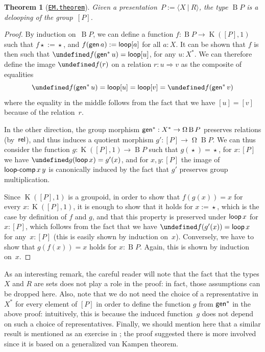 \documentclass[10pt,a4paper]{amsart}
\newtheorem{theorem}{Theorem}
\theoremstyle{definition}
\newcommand{\freegroup}[1]{#1^*} %
\newcommand{\pres}[2]{\langle #1\ |\ #2\rangle} %
\newcommand{\pgroup}[1]{[#1]} %
\newcommand{\B}{\operatorname{B}} %
\newcommand{\pt}[1]{\star_{#1}} %
\newcommand{\trunq}[2]{|#2|_{#1}} %
\newcommand{\strunq}[1]{\trunq0{#1}} %
\newcommand{\defd}{:=} %
\newcommand{\K}{\operatorname{K}} %
\newcommand{\Loop}{\operatorname{\Omega}} %
\let\cong\undefined
\newcommand{\cong}[1]{#1^=} %
\newcommand{\ap}{\cong}
\newcommand{\constructor}[1]{\operatorname{\textsf{\textup{#1}}}}
\newcommand{\cloop}{\constructor{loop}}
\newcommand{\cloopcomp}{\constructor{loop-comp}}
\newcommand{\cgen}{\constructor{gen}}
\newcommand{\crel}{\constructor{rel}}
\newcommand{\To}{\Rightarrow}
\newcommand{\agda}[2]{\href{https://smimram.github.io/generated-deloopings-agda/#1.html\##2}{\texttt{#1.#2}}}
\newcommand{\TODO}[1]{\marginpar{\tiny #1}}
\begin{document}
\begin{theorem}[\agda{EM}{theorem}]
  \label{presented-delooping}
  Given a presentation~$P\defd\pres XR$, the type $\B P$ is a delooping of the group~$\pgroup P$.
\end{theorem}
\begin{proof}
  By induction on~$\B P$, we can define a function $f:\B P\to\K(\pgroup P,1)$ such that
  $f\pt{}\defd\pt{}$, and $f(\cgen a)\defd\cloop\pgroup a$ for all $a:X$. It can
  be shown that $f$ is then such that
  $\cong f(\freegroup\cgen u)=\cloop\pgroup u$, for any $u:\freegroup X$. We can
  therefore define the image $\cong f(r)$ on a relation $r:u\To v$ as the
  composite of equalities
  \[
    \cong f(\freegroup\cgen u)=\cloop\pgroup u=\cloop\pgroup v=\cong f(\freegroup\cgen v)
  \]
  where the equality in the middle follows from the fact that we have
  $\pgroup u=\pgroup v$ because of the relation~$r$.

  In the other direction, the group morphism $\freegroup\cgen:\freegroup{X}\to \Loop\B P$ preserves relations (by~$\crel$), and thus induces a quotient morphism $g':\pgroup P\to\Loop\B P$.
  We can thus consider the function $g:\K(\pgroup P,1)\to\B P$ such that $g(\pt{})=\pt{}$, for $x:\pgroup P$ we have $\ap g(\cloop x)=g'(x)$, and for $x,y:\pgroup P$ the image of $\cloopcomp x\,y$ is canonically induced by the fact that $g'$ preserves group multiplication.

  Since $\K(\pgroup P,1)$ is a groupoid, in order to show that $f(g(x))=x$ for every $x:\K(\pgroup P,1)$, it is enough to show that it holds for $x\defd\pt{}$, which is the case by definition of $f$ and $g$, and that this property is preserved under $\cloop x$ for $x:\pgroup P$, which follows from the fact that we have $\ap f(g'(x))=\cloop x$ for any~$x:\pgroup P$ (this is easily shown by induction on~$x$).
  Conversely, we have to show that $g(f(x))=x$ holds for $x:\B P$. Again, this is shown by induction on~$x$.
\end{proof}

\noindent
As an interesting remark, the careful reader will note that the fact that the types $X$ and $R$ are sets does not play a role in the proof: in fact, those assumptions can be dropped here.
%
Also, note that we do not need the choice of a representative in $\freegroup X$ for every element of $\pgroup P$ in order to define the function $g$ from $\freegroup\cgen$ in the above proof: intuitively, this is because the induced function~$g$ does not depend on such a choice of representatives.
%
Finally, we should mention here that a similar result is mentioned as an exercise in \cite[Example 8.7.17]{hottbook}; the proof suggested there is more involved since it is based on a generalized van Kampen theorem.
\end{document}

